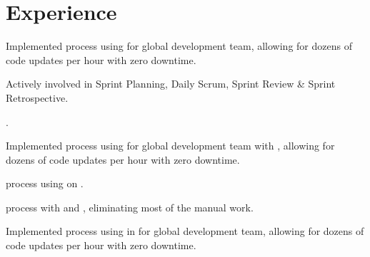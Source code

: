 \documentclass[]{resume-dark}
\begin{document}
\begin{minipage}[t]{0.66\textwidth} 


\section{Experience}
\begin{tightemize}
\item Implemented  process using  for global development team, allowing for dozens of code updates per hour with zero downtime.
\item Actively involved in Sprint Planning, Daily Scrum, Sprint Review \& Sprint Retrospective.
\item {}.
\end{tightemize}
\sectionsep
{}
\begin{tightemize}
\item Implemented  process using  for global development team with , allowing for dozens of code updates per hour with zero downtime.
\item {} process using  on .
\item {} process with  and , eliminating most of the manual work.
\end{tightemize}
\sectionsep
{}
\begin{tightemize}
\item Implemented  process using  in  for global development team, allowing for dozens of code updates per hour with zero downtime.

\end{tightemize}
\end{minipage}
\end{document}
